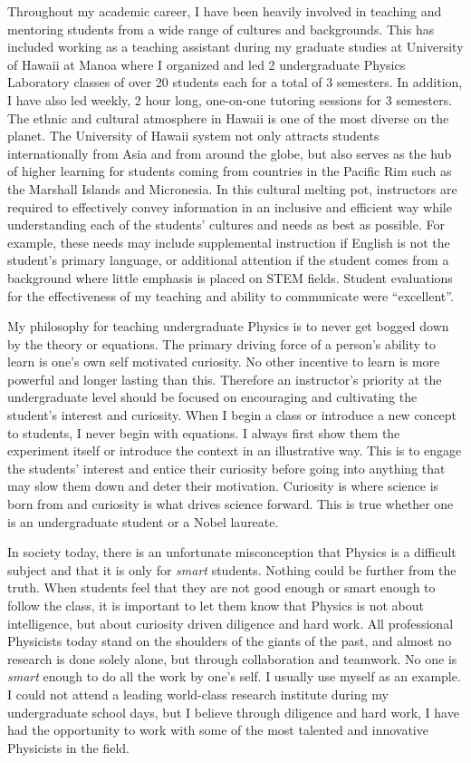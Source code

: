 \documentclass[10pt]{article} %
\begin{document}
Throughout my academic career, I have been heavily involved in teaching and
mentoring students from a wide range of cultures and backgrounds. This has
included working as a teaching assistant during my graduate studies at
University of Hawaii at Manoa where I organized and led 2 undergraduate Physics
Laboratory classes of over 20 students each for a total of 3 semesters. In
addition, I have also led weekly, 2 hour long, one-on-one tutoring sessions for
3 semesters. The ethnic and cultural atmosphere in Hawaii is one of the most
diverse on the planet. The University of Hawaii system not only attracts
students internationally from Asia and from around the globe, but also serves
as the hub of higher learning for students coming from countries in the Pacific
Rim such as the Marshall Islands and Micronesia. In this cultural melting pot,
instructors are required to effectively convey information in an inclusive and
efficient way while understanding each of the students' cultures and needs as
best as possible. For example, these needs may include supplemental instruction
if English is not the student's primary language, or additional attention if
the student comes from a background where little emphasis is placed on STEM
fields. Student evaluations for the effectiveness of my teaching and ability to
communicate were ``excellent''.

My philosophy for teaching undergraduate Physics is to never get bogged down by
the theory or equations. The primary driving force of a person's ability to
learn is one's own self motivated curiosity. No other incentive to learn is
more powerful and longer lasting than this. Therefore an instructor's priority
at the undergraduate level should be focused on encouraging and cultivating the
student's interest and curiosity. When I begin a class or introduce a new
concept to students, I never begin with equations. I always first show them the
experiment itself or introduce the context in an illustrative way. This is to
engage the students' interest and entice their curiosity before going into
anything that may slow them down and deter their motivation. Curiosity is where
science is born from and curiosity is what drives science forward. This is true
whether one is an undergraduate student or a Nobel laureate.

In society today, there is an unfortunate misconception that Physics is a
difficult subject and that it is only for \textit{smart} students. Nothing
could be further from the truth. When students feel that they are not good
enough or smart enough to follow the class, it is important to let them know
that Physics is not about intelligence, but about curiosity driven diligence
and hard work. All professional Physicists today stand on the shoulders of the
giants of the past, and almost no research is done solely alone, but through
collaboration and teamwork. No one is \textit{smart} enough to do all the work
by one's self. I usually use myself as an example. I could not attend a leading
world-class research institute during my undergraduate school days, but I
believe through diligence and hard work, I have had the opportunity to work
with some of the most talented and innovative Physicists in the field.
\end{document}
